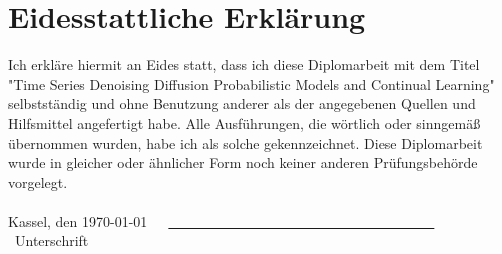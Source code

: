 \chapter*{Eidesstattliche Erklärung}

Ich erkläre hiermit an Eides statt, dass ich diese Diplomarbeit
mit dem Titel "Time Series Denoising Diffusion Probabilistic Models and Continual Learning" selbstständig und ohne Benutzung anderer als der angegebenen Quellen und Hilfsmittel angefertigt habe. Alle Ausführ\-ungen, die wörtlich oder sinngemäß übernommen wurden, habe ich als solche gekennzeichnet. Diese Diplomarbeit wurde in gleicher oder ähnlicher Form noch keiner anderen Prüfungsbehörde vorgelegt.\\
	\vspace{3em}
	\\
	Kassel, den \today \ \ \ \underline{\ \ \ \ \ \ \ \ \ \ \ \ \ \ \ \ \ \ \ \ \ \ \ \ \ \ \ \ \ \ \ \ \ \ \ \ \ \ }\\
	\hspace*{16.6em}\small{\ Unterschrift}